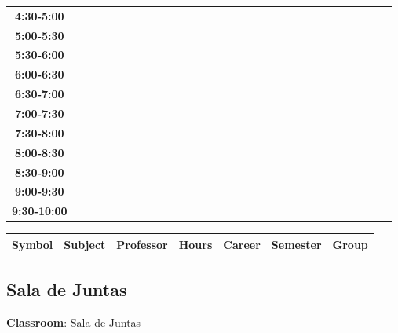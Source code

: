 \documentclass{article}
\begin{document}
\begin{table}[ht]
\begin{tabular}{|c|c|c|c|c|c|c|c|c|c|c|c|c|c|c|c|c|c|c|c|c|c|c|c|c|c|c|c|c|c|}
 \cline{1-8} 
\textbf{4:30-5:00} &   &   &   &   &   &   &   \\
 \cline{1-8} 
\textbf{5:00-5:30} &   &   &   &   &   &   &   \\
 \cline{1-8} 
\textbf{5:30-6:00} &   &   &   &   &   &   &   \\
 \cline{1-8} 
\textbf{6:00-6:30} &   &   &   &   &   &   &   \\
 \cline{1-8} 
\textbf{6:30-7:00} &   &   &   &   &   &   &   \\
 \cline{1-8} 
\textbf{7:00-7:30} &   &   &   &   &   &   &   \\
 \cline{1-8} 
\textbf{7:30-8:00} &   &   &   &   &   &   &   \\
 \cline{1-8} 
\textbf{8:00-8:30} &   &   &   &   &   &   &   \\
 \cline{1-8} 
\textbf{8:30-9:00} &   &   &   &   &   &   &   \\
 \cline{1-8} 
\textbf{9:00-9:30} &   &   &   &   &   &   &   \\
 \cline{1-8} 
\textbf{9:30-10:00} &   &   &   &   &   &   &   \\
 \cline{1-8} 
\end{tabular}\end{table}

        
        \begin{tabular}{|>{\centering\arraybackslash}m{2cm}|>{\centering\arraybackslash}m{4cm}|>{\centering\arraybackslash}m{2.15cm}|>{\centering\arraybackslash}m{1.8cm}|>{\centering\arraybackslash}m{2cm}|>{\centering\arraybackslash}m{2cm}|>{\centering\arraybackslash}m{2cm}|}
        \hline
        \textbf{Symbol} & \textbf{Subject} & \textbf{Professor} & \textbf{Hours} & \textbf{Career} & \textbf{Semester} & \textbf{Group} \\
        \hline
        \end{tabular}
                    

        \newpage
        

        \subsection{Sala de Juntas}
        \vspace*{.1cm}
        
        \begin{flushright}
            {\LARGE \textbf{Classroom}: Sala de Juntas}
        \end{flushright}
        \vspace{1cm}
\end{document}
